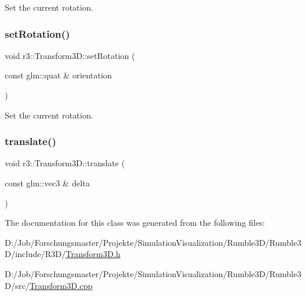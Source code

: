 Set the current rotation. \mbox{\label{classr3_1_1_transform3_d_af539b9a5a73f5196515f9a55ee73be4d}} 
\subsubsection{\texorpdfstring{set\+Rotation()}{setRotation()}\hspace{0.1cm}{\footnotesize\ttfamily [2/2]}}
{\footnotesize\ttfamily void r3\+::\+Transform3\+D\+::set\+Rotation (\begin{DoxyParamCaption}\item[{const glm\+::quat \&}]{orientation }\end{DoxyParamCaption})}

Set the current rotation. \mbox{\label{classr3_1_1_transform3_d_a36ca89f7424b3efec3f2d5532c37f457}} 
\subsubsection{\texorpdfstring{translate()}{translate()}}
{\footnotesize\ttfamily void r3\+::\+Transform3\+D\+::translate (\begin{DoxyParamCaption}\item[{const glm\+::vec3 \&}]{delta }\end{DoxyParamCaption})}



The documentation for this class was generated from the following files\+:\begin{DoxyCompactItemize}
\item 
D\+:/\+Job/\+Forschungsmaster/\+Projekte/\+Simulation\+Visualization/\+Rumble3\+D/\+Rumble3\+D/include/\+R3\+D/\mbox{\hyperlink{_transform3_d_8h}{Transform3\+D.\+h}}\item 
D\+:/\+Job/\+Forschungsmaster/\+Projekte/\+Simulation\+Visualization/\+Rumble3\+D/\+Rumble3\+D/src/\mbox{\hyperlink{_transform3_d_8cpp}{Transform3\+D.\+cpp}}\end{DoxyCompactItemize}
